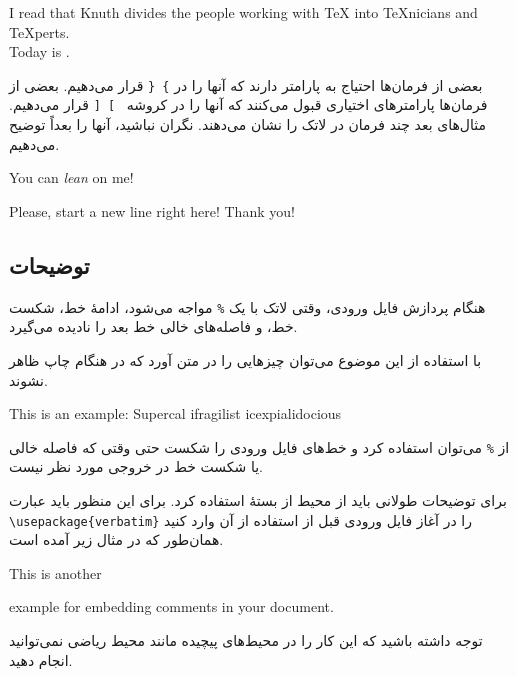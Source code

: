 {\let\today=\originaltoday
\begin{example}
I read that Knuth divides the 
people working with \TeX{} into 
\TeX{}nicians and \TeX perts.\\
Today is \today.
\end{example}
\def\today{\rl{\ftoday}}
بعضی از فرمان‌ها احتیاج به  پارامتر 
دارند که آنها را در  \verb|} {| 
قرار می‌دهیم. بعضی از فرمان‌ها پارامترهای اختیاری
قبول می‌کنند که آنها را در کروشه 
~\verb|] [| قرار می‌دهیم. مثال‌های بعد چند فرمان در لاتک را نشان می‌دهند. نگران نباشید، آنها را بعداً توضیح می‌دهیم.
\begin{example}
You can \textsl{lean} on me!
\end{example}
\begin{example}
Please, start a new line
right here!\newline
Thank you!
\end{example}


\subsection{توضیحات}

 هنگام پردازش فایل ورودی، وقتی لاتک  با یک \verb|%|  مواجه می‌شود، ادامهٔ خط، شکست خط، و فاصله‌های خالی خط بعد را نادیده می‌گیرد.

با استفاده از این موضوع می‌توان چیزهایی را در متن آورد که در هنگام چاپ ظاهر نشوند.

\begin{example}
This is an %
example: Supercal%
              ifragilist%
    icexpialidocious
\end{example}

از \texttt{\%} می‌توان استفاده کرد و خط‌های فایل ورودی را شکست حتی وقتی که فاصله خالی یا شکست خط در خروجی مورد نظر نیست.

برای توضیحات طولانی باید از محیط  از بستهٔ  استفاده کرد.
برای این منظور باید عبارت \verb|\usepackage{verbatim}| را در آغاز فایل ورودی قبل از استفاده از آن وارد کنید همان‌طور که در مثال زیر آمده است.
\begin{example}
This is another
\begin{comment}
rather stupid,
but helpful
\end{comment}
example for embedding
comments in your document.
\end{example}
توجه داشته باشید که این کار را در محیط‌های پیچیده مانند محیط ریاضی نمی‌توانید انجام دهید.
}
